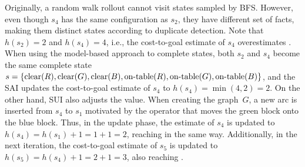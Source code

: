 Originally, a random walk rollout cannot visit states sampled by BFS. However, even though $s_4$ has the same configuration as $s_2$, they have different set of facts, making them distinct states according to duplicate detection. Note that $h(s_2)=2$ and $h(s_4)=4$, i.e., the cost-to-goal estimate of $s_4$ overestimates \hstar. When using the model-based approach to complete states, both $s_2$ and $s_4$ become the same complete state $s = \{\text{clear}(R),\text{clear}(G),\text{clear}(B),\text{on-table}(R),\text{on-table}(G),\text{on-table}(B)\}$, and the SAI updates the cost-to-goal estimate of $s_4$ to $h(s_4)=\min(4,2)=2$. On the other hand, SUI also adjusts the value. When creating the graph~$G$, a new arc is inserted from $s_4$ to $s_1$ motivated by the operator that moves the green block onto the blue block. Thus, in the update phase, the estimate of $s_4$ is updated to $h(s_4)=h(s_1)+1=1+1=2$, reaching \hstar in the same way. Additionally, in the next iteration, the cost-to-goal estimate of $s_5$ is updated to $h(s_5)=h(s_4)+1=2+1=3$, also reaching \hstar.
